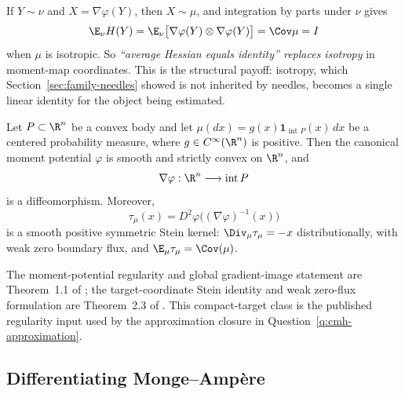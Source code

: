\documentclass[../../main.tex]{subfiles}
\begin{document}
If $Y\sim\nu$ and $X=\nabla\varphi(Y)$, then $X\sim\mu$, and integration by parts under $\nu$ gives
\begin{equation}
  \E_\nu H(Y)=\E_\nu\bigl[\nabla\varphi(Y)\otimes\nabla\varphi(Y)\bigr]=\Cov\mu=I
  \label{eq:mean-hessian-identity}
\end{equation}
when $\mu$ is isotropic. So \emph{``average Hessian equals identity'' replaces isotropy} in
moment-map coordinates. This is the structural payoff: isotropy, which
Section~\ref{sec:family-needles} showed is not inherited by needles, becomes a single linear
identity for the object being estimated.

\begin{theorem}
\label{thm:regular-moment-map-compact-target}
Let $P\subset\R^n$ be a convex body and let
$\mu(dx)=g(x)\mathbf 1_{\operatorname{int}P}(x)\,dx$ be a centered probability measure, where
$g\in C^\infty(\R^n)$ is positive. Then the canonical moment potential $\varphi$ is smooth and
strictly convex on $\R^n$, and
\[
  \nabla\varphi:\R^n\longrightarrow\operatorname{int}P
\]
is a diffeomorphism. Moreover,
\[
  \tau_\mu(x)=D^2\varphi\bigl((\nabla\varphi)^{-1}(x)\bigr)
\]
is a smooth positive symmetric Stein kernel: $\Div_\mu\tau_\mu=-x$ distributionally, with weak
zero boundary flux, and $\E_\mu\tau_\mu=\Cov(\mu)$.
\end{theorem}

The moment-potential regularity and global gradient-image statement are
Theorem~1.1 of \cite{BermanBerndtsson2013RealMA}; the target-coordinate Stein identity and weak
zero-flux formulation are Theorem~2.3 of \cite{Fathi2019SteinMomentMaps}. This compact-target
class is the published regularity input used by the approximation closure in
Question~\ref{q:cmh-approximation}.

\subsection{Differentiating Monge--Amp\`ere}
\label{subsec:mm-differentiated}
\end{document}
